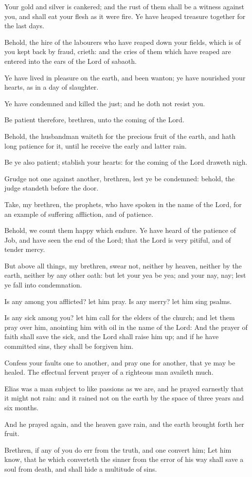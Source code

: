 \verse Your gold and silver is cankered; and the rust of them shall be a witness against you, and shall eat your flesh as it were fire. Ye have heaped treasure together for the last days.

\verse Behold, the hire of the labourers who have reaped down your fields, which is of you kept back by fraud, crieth: and the cries of them which have reaped are entered into the ears of the Lord of sabaoth.

\verse Ye have lived in pleasure on the earth, and been wanton; ye have nourished your hearts, as in a day of slaughter.

\verse Ye have condemned and killed the just; and he doth not resist you.

\verse Be patient therefore, brethren, unto the coming of the Lord.

Behold, the husbandman waiteth for the precious fruit of the earth, and hath long patience for it, until he receive the early and latter rain.

\verse Be ye also patient; stablish your hearts: for the coming of the Lord draweth nigh.

\verse Grudge not one against another, brethren, lest ye be condemned: behold, the judge standeth before the door.

\verse Take, my brethren, the prophets, who have spoken in the name of the Lord, for an example of suffering affliction, and of patience.

\verse Behold, we count them happy which endure. Ye have heard of the patience of Job, and have seen the end of the Lord; that the Lord is very pitiful, and of tender mercy.

\verse But above all things, my brethren, swear not, neither by heaven, neither by the earth, neither by any other oath: but let your yea be yea; and your nay, nay; lest ye fall into condemnation.

\verse Is any among you afflicted? let him pray. Is any merry? let him sing psalms.

\verse Is any sick among you? let him call for the elders of the church; and let them pray over him, anointing him with oil in the name of the Lord: \verse And the prayer of faith shall save the sick, and the Lord shall raise him up; and if he have committed sins, they shall be forgiven him.

\verse Confess your faults one to another, and pray one for another, that ye may be healed. The effectual fervent prayer of a righteous man availeth much.

\verse Elias was a man subject to like passions as we are, and he prayed earnestly that it might not rain: and it rained not on the earth by the space of three years and six months.

\verse And he prayed again, and the heaven gave rain, and the earth brought forth her fruit.

\verse Brethren, if any of you do err from the truth, and one convert him; \verse Let him know, that he which converteth the sinner from the error of his way shall save a soul from death, and shall hide a multitude of sins.

